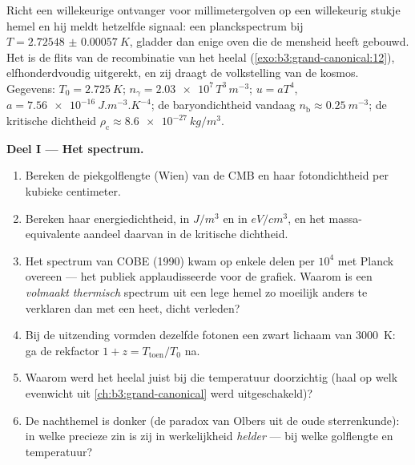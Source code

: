 \begin{problem}\label{pb:b3:photons-phonons:1}
Richt een willekeurige ontvanger voor millimetergolven op een willekeurig
stukje hemel en hij meldt hetzelfde signaal: een planckspectrum bij $T =
\qty{2.72548(57)}{K}$, gladder dan enige oven die de mensheid heeft
gebouwd. Het is de flits van de recombinatie van het heelal
(\cref{exo:b3:grand-canonical:12}), elfhonderdvoudig uitgerekt, en zij
draagt de volkstelling van de kosmos. Gegevens: $T_0 =
\qty{2.725}{K}$;
$n_\gamma = \num{2.03e7}\,T^3\,\unit{m^{-3}}$; $u = aT^4$, $a = \qty{7.56e-16}{J.m^{-3}.K^{-4}}$; de baryondichtheid vandaag
$n_{\text{b}} \approx \qty{0.25}{m^{-3}}$; de kritische dichtheid
$\rho_{\text{c}} \approx \qty{8.6e-27}{kg/m^3}$.

\medskip\noindent\textbf{Deel I --- Het spectrum.}
\begin{enumerate}
  \item Bereken de piekgolflengte (Wien) van de CMB en haar
        fotondichtheid per kubieke centimeter.
  \item Bereken haar energiedichtheid, in $\unit{J/m^3}$ en in
        $\unit{eV/cm^3}$, en het massa-equivalente aandeel daarvan in de
        kritische dichtheid.
  \item Het spectrum van COBE (1990) kwam op enkele delen per $10^4$ met
        Planck overeen --- het publiek applaudisseerde voor de grafiek.
        Waarom is een \emph{volmaakt thermisch} spectrum uit een lege
        hemel zo moeilijk anders te verklaren dan met een heet, dicht
        verleden?
  \item Bij de uitzending vormden dezelfde fotonen een zwart lichaam van
        \qty{3000}{K}: ga de rekfactor $1 + z =
        T_{\text{toen}}/T_0$ na.
  \item Waarom werd het heelal juist bij die temperatuur doorzichtig
        (haal op welk evenwicht uit \cref{ch:b3:grand-canonical} werd
        uitgeschakeld)?
  \item De nachthemel is donker (de paradox van Olbers uit de oude
        sterrenkunde): in welke precieze zin is zij in werkelijkheid
        \emph{helder} --- bij welke golflengte en temperatuur?
\end{enumerate}


\end{problem}
